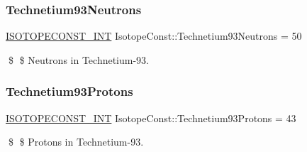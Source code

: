 \subsubsection{\texorpdfstring{Technetium93\+Neutrons}{Technetium93Neutrons}}
{\footnotesize\ttfamily \mbox{\hyperlink{group___isotope_const-_macros_ga5f18360b3e99483a35c32d789e62621c}{I\+S\+O\+T\+O\+P\+E\+C\+O\+N\+S\+T\+\_\+\+I\+NT}} Isotope\+Const\+::\+Technetium93\+Neutrons = 50}

\$ \$ Neutrons in Technetium-\/93. \mbox{\label{group___isotope_const-_technetium-_tc93_gaf98a967b2afec74bcb7c58c896ef3bfc}} 
\subsubsection{\texorpdfstring{Technetium93\+Protons}{Technetium93Protons}}
{\footnotesize\ttfamily \mbox{\hyperlink{group___isotope_const-_macros_ga5f18360b3e99483a35c32d789e62621c}{I\+S\+O\+T\+O\+P\+E\+C\+O\+N\+S\+T\+\_\+\+I\+NT}} Isotope\+Const\+::\+Technetium93\+Protons = 43}

\$ \$ Protons in Technetium-\/93. 